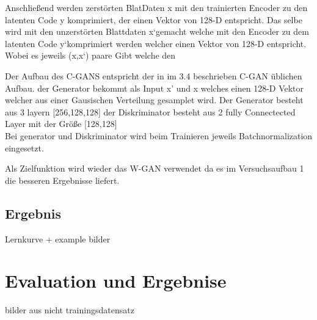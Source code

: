 \documentclass{llncs}
\begin{document}
Anschließend werden zerstörten BlatDaten x mit den trainierten Encoder zu den latenten Code y komprimiert, der einen Vektor von 128-D entspricht.
Das selbe wird mit den unzerstörten Blattdaten x`gemacht welche mit den Encoder zu dem latenten Code y`komprimiert werden welcher einen Vektor von 128-D entspricht. Wobei es jeweils (x,x`) paare Gibt welche den 

Der Aufbau des C-GANS entspricht der in im 3.4 beschrieben C-GAN üblichen Aufbau. der Generator bekommt als Input x' und x welches einen 128-D Vektor welcher aus einer Gausischen Verteilung gesamplet wird. Der Generator besteht aus 3 layern [256,128,128] der Diskriminator besteht aus 2 fully Connectected Layer mit der Größe [128,128]\\ Bei generator und Diskriminator wird beim Trainieren jeweils Batchnormalization eingesetzt. 

Als Zielfunktion wird wieder das W-GAN verwendet da es im Versuchsaufbau 1 die besseren Ergebnisse liefert. 






\subsection{Ergebnis}


Lernkurve + example bilder
\section{Evaluation und Ergebnise}
bilder aus nicht trainingsdatensatz
\end{document}
